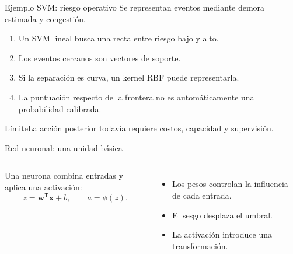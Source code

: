 \documentclass[aspectratio=169,10pt]{beamer}
\begin{document}
\begin{frame}{Ejemplo SVM: riesgo operativo}
  \small
  Se representan eventos mediante demora estimada y congestión.
  \begin{enumerate}
    \item Un SVM lineal busca una recta entre riesgo bajo y alto.
    \item Los eventos cercanos son vectores de soporte.
    \item Si la separación es curva, un kernel RBF puede representarla.
    \item La puntuación respecto de la frontera no es automáticamente una probabilidad calibrada.
  \end{enumerate}
  \begin{alertblock}{Límite}La acción posterior todavía requiere costos, capacidad y supervisión.\end{alertblock}
\end{frame}

\begin{frame}{Red neuronal: una unidad básica}
  \begin{columns}[T]
    Una neurona combina entradas y aplica una activación:
    \[
      z=\mathbf{w}^{\mathsf T}\mathbf{x}+b,
      \qquad a=\phi(z).
    \]
    \begin{itemize}
      \item Los pesos controlan la influencia de cada entrada.
      \item El sesgo desplaza el umbral.
      \item La activación introduce una transformación.
    \end{itemize}
    \centering
  \end{columns}
\end{frame}
\end{document}
